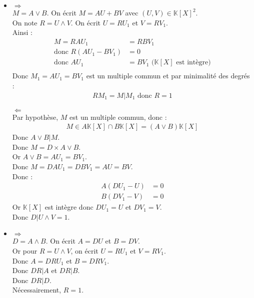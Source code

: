 \documentclass[../main.tex]{subfiles}
\begin{document}
\begin{itemize}
    \item \indent \indent $\boxed{\Rightarrow}$ \\
    $M = A \vee B$. On écrit $M = AU + BV$ avec $(U, V) \in \mathbb{K}[X]^2$. \\
    On note $R = U \wedge V$. On écrit $U = RU_1$ et $V = RV_1$. \\
    Ainsi :
    \begin{align*}
        M = RAU_1 &= RBV_1 \\
        \text{donc } R(AU_1 - BV_1) &= 0 \\
        \text{donc } AU_1 &= BV_1 \text{ ($\mathbb{K}[X]$ est intègre)} \\
    \end{align*}
    Donc $M_1 = AU_1 = BV_1$ est un multiple commun et par minimalité des degrés : 
    \begin{align*}
        RM_1 = M | M_1 \text{ donc } R = 1
    \end{align*}

    $\boxed{\Leftarrow}$ \\
    Par hypothèse, $M$ est un multiple commun, donc : 
    \begin{align*}
        M \in A \mathbb{K}[X] \cap B \mathbb{K}[X] = (A \vee B) \mathbb{K}[X]
    \end{align*}
    Donc $A \vee B | M$. \\
    Donc $M = D \times A \vee B$. \\
    Or $A \vee B = AU_1 = BV_1$. \\
    Donc $M = DAU_1 = DBV_1 = AU = BV$. \\
    Donc : 
    \begin{align*}
        A(DU_1 - U) &= 0 \\
        B(DV_1 - V) &= 0
    \end{align*}
    Or $\mathbb{K}[X]$ est intègre donc $DU_1 = U$ et $DV_1 = V$. \\
    Donc $D | U \wedge V = 1$. \\
    
    \item \indent \indent $\boxed{\Rightarrow}$ \\
    $D = A \wedge B$. On écrit $A = DU$ et $B = DV$. \\
    Or pour $R = U \wedge V$, on écrit $U = RU_1$ et $V = RV_1$. \\
    Donc $A = DRU_1$ et $B = DRV_1$. \\
    Donc $DR | A$ et $DR | B$. \\
    Donc $DR | D$. \\
    Nécessairement, $R = 1$. \\


\end{itemize}
\end{document}
